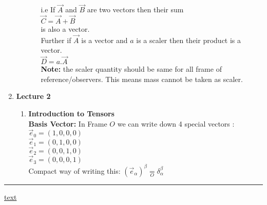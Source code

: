 \documentclass[11pt,a4paper]{article}
\begin{document}
\begin{enumerate}
\begin{enumerate}
\begin{enumerate}
                              i.e If $\vec{A}$ and $\vec{B}$ are two vectors then their sum\\
                              $\vec{C}=\vec{A}+\vec{B}$\\
                              is also a vector.\\
                              Further if $\vec{A}$ is a vector and $a$ is a scaler then their product is a vector.\\
                              $\vec{D}=a.\vec{A}$\\
                              \textbf{Note:} the scaler quantity should be same for all frame of reference/observers. This means mass cannot be taken as scaler.

                    \end{enumerate}
          \end{enumerate}
    \item \textbf{\LARGE Lecture 2}
          \begin{enumerate}
              \item \textbf{Introduction to Tensors}\\
              \textbf{Basis Vector:} In Frame $O$ we can write down 4 special vectors :\\
              $\vec e_0 = (1,0,0,0)$\\
              $\vec e_1 = (0,1,0,0)$\\
              $\vec e_2 = (0,0,1,0)$\\
              $\vec e_3 = (0,0,0,1)$\\
              Compact way of writing this:           
              $(\vec e_{\alpha})^{\beta}\mathop = \limits^{}_{O}  \delta^{\beta}_{\alpha}$\\                            
          \end{enumerate}
\end{enumerate}
\noindent\rule{\textwidth}{1pt}
\href{https://youtu.be/iRVfaR3N5K4?t=3847}{text}
\end{document}
